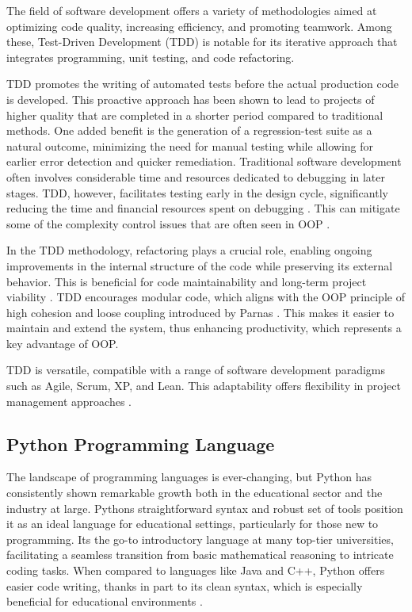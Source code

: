 The field of software development offers a variety of methodologies
aimed at optimizing code quality, increasing efficiency, and promoting
teamwork. Among these, Test-Driven Development (TDD) is notable for its
iterative approach that integrates programming, unit testing, and code
refactoring.

TDD promotes the writing of automated tests before the actual production
code is developed. This proactive approach has been shown to lead to
projects of higher quality that are completed in a shorter period
compared to traditional methods. One added benefit is the generation of
a regression-test suite as a natural outcome, minimizing the need for
manual testing while allowing for earlier error detection and quicker
remediation. Traditional software development often involves
considerable time and resources dedicated to debugging in later stages.
TDD, however, facilitates testing early in the design cycle,
significantly reducing the time and financial resources spent on
debugging \cite{29}. This can
mitigate some of the complexity control issues that are often seen in
OOP \cite{23}\cite{25}.

In the TDD methodology, refactoring plays a crucial role, enabling
ongoing improvements in the internal structure of the code while
preserving its external behavior. This is beneficial for code
maintainability and long-term project viability
\cite{30}. TDD encourages
modular code, which aligns with the OOP principle of high cohesion and
loose coupling introduced by Parnas
\cite{17}\cite{24}. This
makes it easier to maintain and extend the system, thus enhancing
productivity, which represents a key advantage of OOP.

TDD is versatile, compatible with a range of software development
paradigms such as Agile, Scrum, XP, and Lean. This adaptability offers
flexibility in project management approaches
\cite{31}.

\subsection{Python Programming
Language}\label{python-programming-language}

The landscape of programming languages is ever-changing, but Python has
consistently shown remarkable growth both in the educational sector and
the industry at large. Python\textquotesingle s straightforward syntax
and robust set of tools position it as an ideal language for educational
settings, particularly for those new to programming.
It\textquotesingle s the go-to introductory language at many top-tier
universities, facilitating a seamless transition from basic mathematical
reasoning to intricate coding tasks. When compared to languages like
Java and C++, Python offers easier code writing, thanks in part to its
clean syntax, which is especially beneficial for educational
environments \cite{32}.

